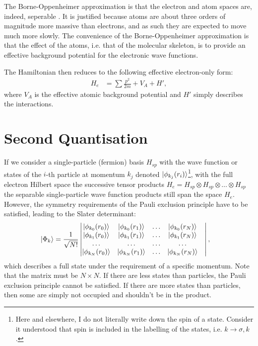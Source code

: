 The Borne-Oppenheimer approximation is that the electron and atom spaces are, indeed, seperable \cite{mattuck}. It is justified because atoms are about three orders of magnitude more massive than electrons, and as such they are expected to move much more slowly. The convenience of the Borne-Oppenheimer approximation is that the effect of the atoms, i.e. that of the molecular skeleton, is to provide an effective background potential for the electronic wave functions.

The Hamiltonian then reduces to the following effective electron-only form:
\begin{align}
H_e &= \sum \frac{p^2}{2m} + V_A + H',
\end{align}
where $V_A$ is the effective atomic background potential and $H'$ simply describes the interactions.

\section{Second Quantisation}
\label{sec:secondquantisation}
If we consider a single-particle (fermion) basis $H_{sp}$ with the wave function or states of the $i$-th particle at momentum $k_j$ denoted $\ket{\phi_{k_j}(r_i)}$\footnote{Here and elsewhere, I do not literally write down the spin of a state. Consider it understood that spin is included in the labelling of the states, i.e. $k \rightarrow \sigma, k$.}, with the full electron Hilbert space the successive tensor products $H_{e} = H_{sp} \otimes H_{sp} \otimes \ldots \otimes H_{sp}$ the separable single-particle wave function products still span the space $H_e$. However, the symmetry requirements of the Pauli exclusion principle have to be satisfied, leading to the Slater determinant\cite{yuli}:
\begin{align}
\ket{\Phi_k} &= \frac{1}{\sqrt{N!}} \begin{vmatrix}
\ket{\phi_{k_0}(r_0)} & \ket{\phi_{k_0}(r_1)} &\ldots& \ket{\phi_{k_0}(r_N)} \\
\ket{\phi_{k_1}(r_0)} & \ket{\phi_{k_1}(r_1)} &\ldots& \ket{\phi_{k_1}(r_N)} \\
\ldots&\ldots&\ldots&\ldots&\\
\ket{\phi_{k_N}(r_0)} & \ket{\phi_{k_N}(r_1)} &\ldots& \ket{\phi_{k_N}(r_N)} \\
\end{vmatrix},
\label{eq:slaterdeterminant}
\end{align}
which describes a full state under the requirement of a specific momentum. Note that the matrix must be $N\times N$. If there are less states than particles, the Pauli exclusion principle cannot be satisfied. If there are more states than particles, then some are simply not occupied and shouldn't be in the product.

